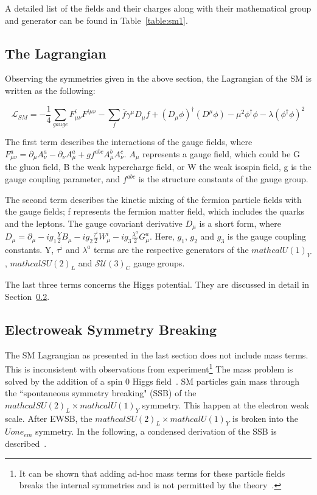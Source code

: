     A detailed list of the fields and their charges along with their mathematical group and generator can be found in Table~\ref{table:sm1}.

\subsection{The Lagrangian}

Observing the symmetries given in the above section, the Lagrangian of the SM is written as the following:

\begin{equation}
    \mathcal{L}_{SM}= - \frac{1}{4} \sum\limits_{gauge} F^{i}_{\mu \nu}F^{i\mu\nu} - \sum\limits_{f} \overline{f} \gamma^{\mu} D_{\mu} f +(D_{\mu}\phi)^{\dagger}(D^{\mu}\phi) - \mu^{2}\phi^{\dagger}\phi - \lambda(\phi^{\dagger}\phi)^{2}
    \label{eq:SMLagrangian}
\end{equation}

The first term describes the interactions of the gauge fields, where $F^{a}_{\mu\nu}=\partial_{\mu}A_{\nu}^{a}-\partial_{\nu}A_{\mu}^{a}+g f^{abc}A^{b}_{\mu}A^{c}_{\nu}$. $A_{\mu}$ represents a gauge field, which could be G the gluon field, B the weak hypercharge field, or W the weak isospin field, g is the gauge coupling parameter, and $f^{abc}$ is the structure constants of the gauge group. 

The second term describes the kinetic mixing of the fermion particle fields with the gauge fields; f represents the fermion matter field, which includes the quarks and the leptons. The gauge covariant derivative $D_{\mu}$ is a short form, where $D_{\mu}=\partial_{\mu}-i g_{1} \frac{Y}{2}B_{\mu} - i g_{2}\frac{\tau ^{i}}{2}W_{\mu}^{i} - ig_{3}\frac{\lambda^{a}}{2}G^{a}_{\mu}$. Here, $g_{1}$, $g_{2}$ and $g_{3}$ is the gauge coupling constants. Y, $\tau ^{i}$ and $\lambda^{a}$ terms are the respective generators of the $mathcal{U}(1)_{Y}$, $mathcal{SU}(2)_{L}$ and $\mathcal{SU}(3)_{C}$ gauge groups.

The last three terms concerns the Higgs potential. They are discussed in detail in Section~\ref{sec:SSB}.

\subsection{Electroweak Symmetry Breaking}
\label{sec:SSB}
The SM Lagrangian as presented in the last section does not include mass terms. This is inconsistent with observations from experiment\footnote{It can be shown that adding ad-hoc mass terms for these particle fields breaks the internal symmetries and is not permitted by the theory~\cite{peskin2018introduction}.} The mass problem is solved by the addition of a spin 0 Higgs field~\cite{higgs1964broken}. SM particles gain mass through the ``spontaneous symmetry breaking" (SSB) of the $mathcal{SU}(2)_{L} \times mathcal{U}(1)_{Y}$ symmetry. This happen at the electron weak scale. After EWSB, the $mathcal{SU}(2)_{L} \times mathcal{U}(1)_{Y}$ is broken into the $Uone_{em}$ symmetry. In the following, a condensed derivation of the SSB is described~\cite{peskin2018introduction}.


